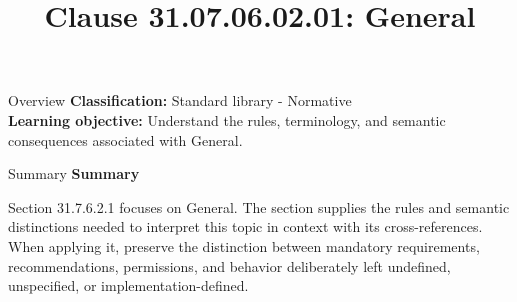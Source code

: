 \documentclass[10pt,letterpaper]{article}
\title{Clause 31.07.06.02.01: General}
\author{}
\date{}
\begin{document}
\maketitle
\begin{CornellOverviewBox}{Overview}
\textbf{Classification:} Standard library - Normative\\[2pt]
\textbf{Learning objective:} Understand the rules, terminology, and semantic consequences associated with General.
\end{CornellOverviewBox}\begin{CornellSummaryBox}{Summary}
{\sffamily\bfseries\color{Accent} Summary}\par\vspace{3pt}Section 31.7.6.2.1 focuses on General. The section supplies the rules and semantic distinctions needed to interpret this topic in context with its cross-references. When applying it, preserve the distinction between mandatory requirements, recommendations, permissions, and behavior deliberately left undefined, unspecified, or implementation-defined.
\end{CornellSummaryBox}
\end{document}

